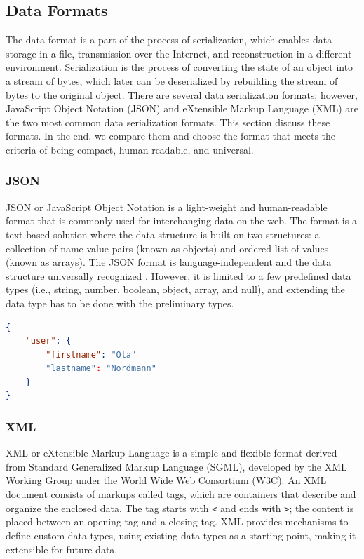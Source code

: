 \subsection{Data Formats} \label{sec:dataformat}

The data format is a part of the process of serialization, which enables data storage in a file, transmission over the Internet, and reconstruction in a different environment. Serialization is the process of converting the state of an object into a stream of bytes, which later can be deserialized by rebuilding the stream of bytes to the original object. There are several data serialization formats; however, JavaScript Object Notation (JSON) and eXtensible Markup Language (XML) are the two most common data serialization formats. This section discuss these formats. In the end, we compare them and choose the format that meets the criteria of being compact, human-readable, and universal. 

\subsubsection{JSON}
JSON or JavaScript Object Notation is a light-weight and human-readable format that is commonly used for interchanging data on the web. The format is a text-based solution where the data structure is built on two structures: a collection of name-value pairs (known as objects) and ordered list of values (known as arrays). The JSON format is language-independent and the data structure universally recognized \cite{jsonorg, jsonvxml}. However, it is limited to a few predefined data types (i.e., string, number, boolean, object, array, and null), and extending the data type has to be done with the preliminary types. 

\begin{lstlisting}[language=json, caption={}, captionpos=b]
{
    "user": {
        "firstname": "Ola"
        "lastname": "Nordmann"
    }
}
\end{lstlisting}

\subsubsection{XML}
XML or eXtensible Markup Language is a simple and flexible format derived from Standard Generalized Markup Language (SGML), developed by the XML Working Group under the World Wide Web Consortium (W3C). An XML document consists of markups called tags, which are containers that describe and organize the enclosed data. The tag starts with \verb|<| and ends with \verb|>|; the content is placed between an opening tag and a closing tag. \cite{w3xml, jsonvxml} XML provides mechanisms to define custom data types, using existing data types as a starting point, making it extensible for future data. 

